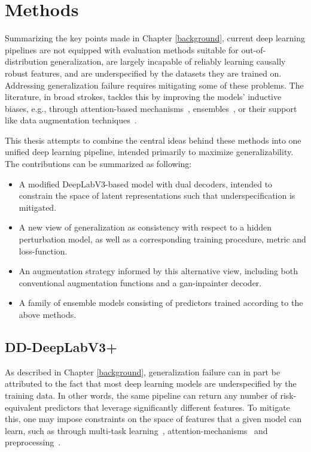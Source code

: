 \chapter{Methods}\label{methods}
Summarizing the key points made in Chapter \ref{background}, current deep learning pipelines are not equipped with evaluation methods suitable for out-of-distribution generalization, are largely incapable of reliably learning causally robust features, and are underspecified by the datasets they are trained on. Addressing generalization failure requires mitigating some of these problems. The literature, in broad strokes, tackles this by improving the models' inductive biases, e.g., through attention-based mechanisms~\cite{attention_generalizability, reverse_attention}, ensembles~\cite{divergentnets, endoensemble}, or their support like data augmentation techniques~\cite{polyp_augmentation, cyclegan}. 

This thesis attempts to combine the central ideas behind these methods into one unified deep learning pipeline, intended primarily to maximize generalizability. The contributions can be summarized as following:

\begin{itemize}
    \item A modified DeepLabV3-based model with dual decoders, intended to constrain the space of latent representations such that underspecification is mitigated.
    \item A new view of generalization as consistency with respect to a hidden perturbation model, as well as a corresponding training procedure, metric and loss-function.
    \item An augmentation strategy informed by this alternative view, including both conventional augmentation functions and a \gls{gan}-inpainter decoder.
    \item A family of ensemble models consisting of predictors trained according to the above methods.
\end{itemize}

\section{DD-DeepLabV3+}
As described in Chapter \ref{background}, generalization failure can in part be attributed to the fact that most deep learning models are underspecified by the training data. In other words, the same pipeline can return any number of risk-equivalent predictors that leverage significantly different features. To mitigate this, one may impose constraints on the space of features that a given model can learn, such as through multi-task learning~\cite{ddanet}, attention-mechanisms~\cite{attention_generalizability, reverse_attention} and preprocessing~\cite{visual_cortex}. 

